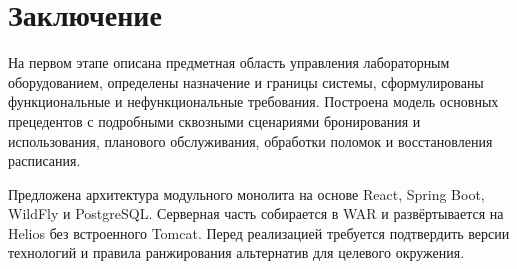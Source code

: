 \documentclass[12pt,a4paper]{article}
\begin{document}
\section{Заключение}

На первом этапе описана предметная область управления лабораторным
оборудованием, определены назначение и границы системы, сформулированы
функциональные и нефункциональные требования. Построена модель основных
прецедентов с подробными сквозными сценариями бронирования и использования,
планового обслуживания, обработки поломок и восстановления расписания.

Предложена архитектура модульного монолита на основе React, Spring Boot,
WildFly и PostgreSQL. Серверная часть собирается в WAR и развёртывается на
Helios без встроенного Tomcat. Перед реализацией требуется подтвердить версии
технологий и правила ранжирования альтернатив для целевого окружения.
\end{document}
